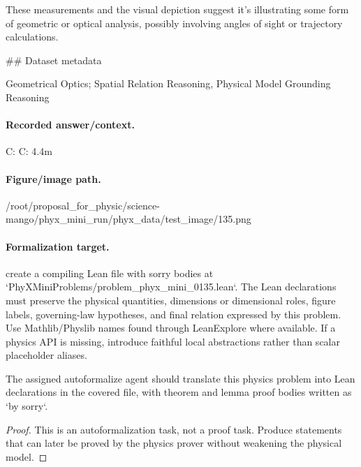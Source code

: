 These measurements and the visual depiction suggest it’s illustrating some form of geometric or optical analysis, possibly involving angles of sight or trajectory calculations.

\#\# Dataset metadata

Geometrical Optics; Spatial Relation Reasoning, Physical Model Grounding Reasoning

\paragraph{Recorded answer/context.}
C: C: 4.4m

\paragraph{Figure/image path.}
/root/proposal\_for\_physic/science-mango/phyx\_mini\_run/phyx\_data/test\_image/135.png

\paragraph{Formalization target.}
create a compiling Lean file with sorry bodies at `PhyXMiniProblems/problem\_phyx\_mini\_0135.lean`. The Lean declarations must preserve the physical quantities, dimensions or dimensional roles, figure labels, governing-law hypotheses, and final relation expressed by this problem.
Use Mathlib/Physlib names found through LeanExplore where available. If a physics API is missing, introduce faithful local abstractions rather than scalar placeholder aliases.

\begin{theorem}
\label{thm:physics:phyx_mini_0135:target}
The assigned autoformalize agent should translate this physics problem into Lean declarations in the covered file, with theorem and lemma proof bodies written as `by sorry`.
\end{theorem}
\begin{proof}
This is an autoformalization task, not a proof task. Produce statements that can later be proved by the physics prover without weakening the physical model.
\end{proof}

